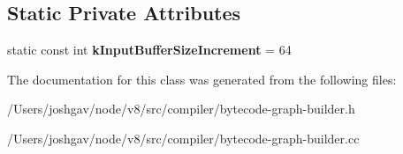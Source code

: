 \subsection*{Static Private Attributes}
\begin{DoxyCompactItemize}
\item 
static const int {\bfseries k\+Input\+Buffer\+Size\+Increment} = 64\hypertarget{classv8_1_1internal_1_1compiler_1_1_bytecode_graph_builder_a0ce9e1689fa695d1465bbcfe009675ab}{}\label{classv8_1_1internal_1_1compiler_1_1_bytecode_graph_builder_a0ce9e1689fa695d1465bbcfe009675ab}

\end{DoxyCompactItemize}


The documentation for this class was generated from the following files\+:\begin{DoxyCompactItemize}
\item 
/\+Users/joshgav/node/v8/src/compiler/bytecode-\/graph-\/builder.\+h\item 
/\+Users/joshgav/node/v8/src/compiler/bytecode-\/graph-\/builder.\+cc\end{DoxyCompactItemize}
